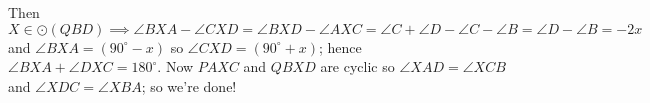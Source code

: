 Then \[ X \in \odot(QBD) \implies \angle BXA-\angle CXD=\angle BXD-\angle AXC=\angle C+\angle D-\angle C-\angle B=\angle D-\angle B=-2x \]
and $\angle BXA=(90^{\circ}-x)$ so $\angle CXD=(90^{\circ}+x)$;
hence $\angle BXA+\angle DXC=180^{\circ}$.
Now $PAXC$ and $QBXD$ are cyclic so $\angle{XAD} = \angle{XCB}$ and $\angle{XDC} = \angle{XBA}$; so we're done!
